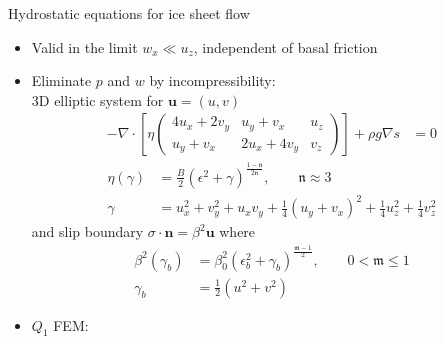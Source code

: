 \begin{frame}{Hydrostatic equations for ice sheet flow}
  \begin{itemize}
  \item Valid in the limit $w_x \ll u_z$, independent of basal friction
  \item Eliminate $p$ and $w$ by incompressibility:\\
    \quad 3D elliptic system for $\bm u = (u,v)$
    \begin{align*}
      - \nabla\cdot \left[ \eta
        \begin{pmatrix}
          4 u_x + 2 v_y & u_y + v_x & u_z \\
          u_y + v_x & 2 u_x + 4 v_y & v_z
        \end{pmatrix} \right] + \rho g \nabla s & = 0
    \end{align*}
    \begin{align*}
      \eta(\gamma) &= \frac B 2 (\epsilon^2 + \gamma)^{\frac{1-\mathfrak n}{2\mathfrak n}}, \qquad \mathfrak n \approx 3 \\
      \gamma &= u_x^2 + v_y^2 + u_xv_y + \frac 1 4 (u_y+v_x)^2 + \frac 1 4 u_z^2 + \frac 1 4 v_z^2
    \end{align*}
    and slip boundary $\sigma \cdot \bm n = \beta^2 \bm u$ where
    \begin{align*}
      \beta^2(\gamma_b) &= \beta_0^2 (\epsilon_b^2 + \gamma_b)^{\frac{\mathfrak m-1}{2}}, \qquad 0 < \mathfrak m \le 1 \\
      \gamma_b &= \frac 1 2 (u^2 + v^2)
    \end{align*}
  \item $Q_1$ FEM: 
  \end{itemize}
\end{frame}

